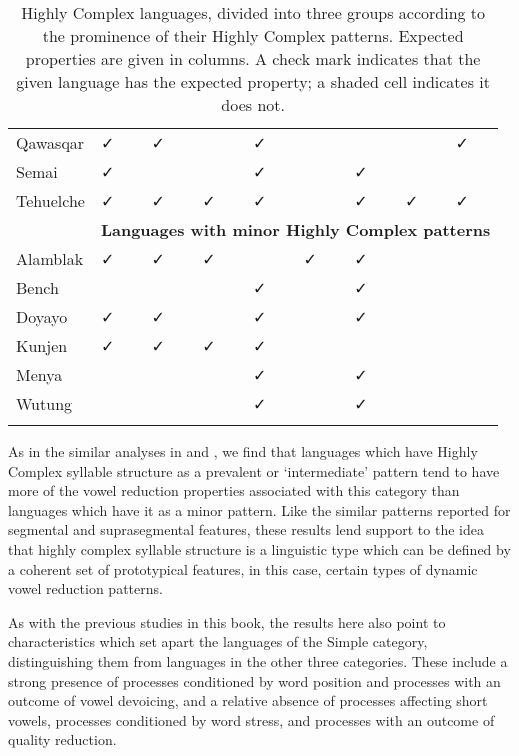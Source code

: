 \begin{table}
\begin{tabularx}{\textwidth}{XXXXXXXXX}
\hhline{~--------}
 Qawasqar & ✓ & ✓ &  & ✓ &  &  &  & ✓\\
\hhline{~--------}
 Semai & ✓ &  &  & ✓ &  & ✓ &  & \\
\hhline{~--------}
 Tehuelche & ✓ & ✓ & ✓ & ✓ &  & ✓ & ✓ & ✓\\
& \multicolumn{8}{c}{ \textbf{Languages with minor Highly Complex patterns}}\\
\hhline{~--------}
 Alamblak & ✓ & ✓ & ✓ &  & ✓ & ✓ &  & \\
\hhline{~--------}
 Bench &  &  &  & ✓ &  & ✓ &  & \\
\hhline{~--------}
 Doyayo & ✓ & ✓ &  & ✓ &  & ✓ &  & \\
\hhline{~--------}
 Kunjen & { ✓} & ✓ & ✓ & ✓ &  &  &  & \\
\hhline{~--------}
 Menya &  &  &  & ✓ &  & ✓ &  & \\
\hhline{~--------}
 Wutung &  &  &  & ✓ &  & ✓ &  & \\
\lspbottomrule
\end{tabularx}
\caption{\label{tab:6.11}Highly Complex languages, divided into three groups according to the prominence of their Highly Complex patterns. Expected properties are given in columns. A check mark indicates that the given language has the expected property; a shaded cell indicates it does not.}
\end{table}

  As in the similar analyses in  and , we find that languages which have Highly Complex syllable structure as a prevalent or ‘intermediate’ pattern tend to have more of the vowel reduction properties associated with this category than languages which have it as a minor pattern. Like the similar patterns reported for segmental and suprasegmental features, these results lend support to the idea that highly complex syllable structure is a linguistic type which can be defined by a coherent set of prototypical features, in this case, certain types of dynamic vowel reduction patterns.

  As with the previous studies in this book, the results here also point to characteristics which set apart the languages of the Simple category, distinguishing them from languages in the other three categories. These include a strong presence of processes conditioned by word position and processes with an outcome of vowel devoicing, and a relative absence of processes affecting short vowels, processes conditioned by word stress, and processes with an outcome of quality reduction.

